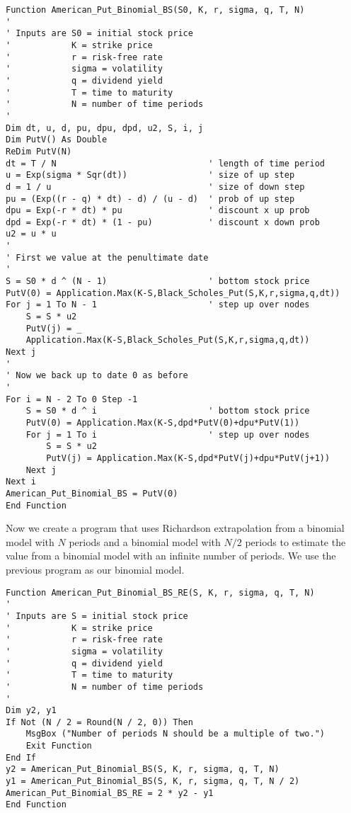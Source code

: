 \small\begin{verbatim}
Function American_Put_Binomial_BS(S0, K, r, sigma, q, T, N)
'
' Inputs are S0 = initial stock price
'            K = strike price
'            r = risk-free rate
'            sigma = volatility
'            q = dividend yield
'            T = time to maturity
'            N = number of time periods
'
Dim dt, u, d, pu, dpu, dpd, u2, S, i, j
Dim PutV() As Double
ReDim PutV(N)
dt = T / N                              ' length of time period
u = Exp(sigma * Sqr(dt))                ' size of up step
d = 1 / u                               ' size of down step
pu = (Exp((r - q) * dt) - d) / (u - d)  ' prob of up step
dpu = Exp(-r * dt) * pu                 ' discount x up prob
dpd = Exp(-r * dt) * (1 - pu)           ' discount x down prob
u2 = u * u
'
' First we value at the penultimate date
'
S = S0 * d ^ (N - 1)                    ' bottom stock price
PutV(0) = Application.Max(K-S,Black_Scholes_Put(S,K,r,sigma,q,dt)) 
For j = 1 To N - 1                      ' step up over nodes
    S = S * u2
    PutV(j) = _
    Application.Max(K-S,Black_Scholes_Put(S,K,r,sigma,q,dt))
Next j
'
' Now we back up to date 0 as before
'
For i = N - 2 To 0 Step -1               
    S = S0 * d ^ i                      ' bottom stock price
    PutV(0) = Application.Max(K-S,dpd*PutV(0)+dpu*PutV(1))
    For j = 1 To i                      ' step up over nodes
        S = S * u2
        PutV(j) = Application.Max(K-S,dpd*PutV(j)+dpu*PutV(j+1))
    Next j
Next i
American_Put_Binomial_BS = PutV(0)         
End Function
\end{verbatim}\normalsize

\noindent Now we create a program that uses Richardson extrapolation from a binomial model with $N$ periods and a binomial model with $N/2$ periods to estimate the value from a binomial model with an infinite number of periods.  We use the previous program as our binomial model.

\small\begin{verbatim}
Function American_Put_Binomial_BS_RE(S, K, r, sigma, q, T, N)
'
' Inputs are S = initial stock price
'            K = strike price
'            r = risk-free rate
'            sigma = volatility
'            q = dividend yield
'            T = time to maturity
'            N = number of time periods
'
Dim y2, y1
If Not (N / 2 = Round(N / 2, 0)) Then
    MsgBox ("Number of periods N should be a multiple of two.")
    Exit Function
End If
y2 = American_Put_Binomial_BS(S, K, r, sigma, q, T, N)
y1 = American_Put_Binomial_BS(S, K, r, sigma, q, T, N / 2)
American_Put_Binomial_BS_RE = 2 * y2 - y1
End Function
\end{verbatim}\normalsize



